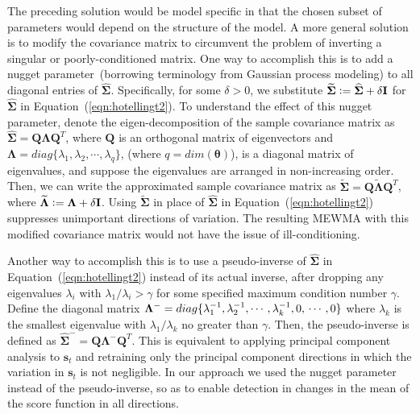 \documentclass[twoside,11pt]{article}
\begin{document}
The preceding solution would be model specific in that the chosen subset of parameters would depend on the structure of the model. A more general solution is to modify the covariance matrix to circumvent the problem of inverting a singular or poorly-conditioned matrix. One way to accomplish this is to add a nugget parameter~(borrowing terminology from Gaussian process modeling) to all diagonal entries of $\widehat {\bm { \Sigma}}$. Specifically, for some $\delta>0$, we substitute $\widetilde {\bm { \Sigma}} \vcentcolon= \widehat {\bm { \Sigma}}+ \delta \mathbf {I}$ for $\widehat {\bm { \Sigma}}$ in Equation~(\ref{eqn:hotellingt2}). To understand the effect of this nugget parameter, denote the eigen-decomposition of the sample covariance matrix as $\widehat {\bm { \Sigma}} = \mathbf {Q}\bm { \Lambda} \mathbf {Q}^T$, where $\mathbf {Q}$ is an orthogonal matrix of eigenvectors and $\bm{\Lambda}=diag\{\lambda_1, \lambda_2,\cdots, \lambda_{q}\}$, (where $q=dim(\bm{\theta})$), is a diagonal matrix of eigenvalues, and suppose the eigenvalues are arranged in non-increasing order. Then, we can write the approximated sample covariance matrix as $\widetilde {\bm { \Sigma}} = \mathbf {Q}\widetilde{\bm { \Lambda}} \mathbf {Q}^T$, where $\widetilde{\bm { \Lambda}} \vcentcolon= \bm { \Lambda} + \delta \mathbf {I}$. Using $\widetilde {\bm { \Sigma}}$ in place of $\widehat {\bm { \Sigma}}$ in Equation~(\ref{eqn:hotellingt2}) suppresses unimportant directions of variation. The resulting MEWMA with this modified covariance matrix would not have the issue of ill-conditioning. 

Another way to accomplish this is to use a pseudo-inverse of $\widehat {\bm { \Sigma}}$ in Equation~(\ref{eqn:hotellingt2}) instead of its actual inverse, after dropping any eigenvalues $\lambda_i$ with $\lambda_1/\lambda_i>\gamma$ for some specified maximum condition number $\gamma$. Define the diagonal matrix $\bm { \Lambda} ^{-}=diag\{\lambda_1^{-1},\lambda_2^{-1},\cdots,\lambda_k^{-1},0,\\ \cdots,0\}$ where $\lambda_k$ is the smallest eigenvalue with $\lambda_1/\lambda_k$ no greater than $\gamma$. Then, the pseudo-inverse is defined as $\widehat {\bm { \Sigma}} ^{-} = \mathbf {Q}\bm { \Lambda}^{-}\mathbf {Q}^T$. This is equivalent to applying principal component analysis to $\bm{s}_t$ and retraining only the principal component directions in which the variation in $\bm{s}_t$ is not negligible. In our approach we used the nugget parameter instead of the pseudo-inverse, so as to enable detection in changes in the mean of the score function in all directions. 
\end{document}
